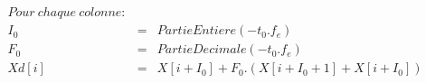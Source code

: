\begin{eqnarray*}
Pour ~chaque ~colonne : \\
I_0 & = & Partie Entiere(-t_0 . f_e ) \\
F_0 & = & Partie Decimale(-t_0 . f_e ) \\
Xd[i] & = & X[i+I_0] + F_0.\left( X[i+I_0+1] + X[i+I_0] \right) \\
\end{eqnarray*}
